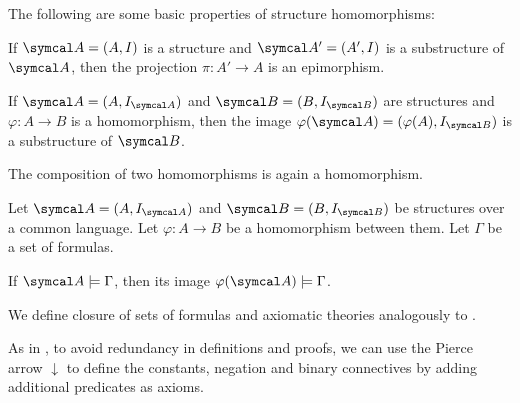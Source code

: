 \begin{proposition}\label{thm:first_order_homomorphism_properties}
  The following are some basic properties of structure homomorphisms:
  \begin{defenum}
     If \( \Cal{A} = (A, I) \) is a structure and \( \Cal{A'} = (A', I) \) is a substructure of \( \Cal{A} \), then the projection \( \pi: A' \to A \) is an epimorphism.

     If \( \Cal{A} = (A, I_{\Cal{A}}) \) and \( \Cal{B} = (B, I_{\Cal{B}}) \) are structures and \( \varphi: A \to B \) is a homomorphism, then the image \( \varphi(\Cal{A}) = (\varphi(A), I_{\Cal{B}}) \) is a substructure of \( \Cal{B} \).

     The composition of two homomorphisms is again a homomorphism.
  \end{defenum}
\end{proposition}

\begin{proposition}\label{thm:first_order_homomorphism_preserves_models}\cite[definition 23.8]{OpenLogic20201202}
  Let \( \Cal{A} = (A, I_{\Cal{A}}) \) and \( \Cal{B} = (B, I_{\Cal{B}}) \) be structures over a common language. Let \( \varphi: A \to B \) be a homomorphism between them. Let \( \Gamma \) be a set of formulas.

  If \( \Cal{A} \models \Gamma \), then its image \( \varphi(\Cal{A}) \models \Gamma \).
\end{proposition}

\begin{definition}\label{def:first_order_theory}
  We define closure of sets of formulas and axiomatic theories analogously to .
\end{definition}

\begin{remark}\label{remark:minimal_first_order_language}
  As in , to avoid redundancy in definitions and proofs, we can use the Pierce arrow \( \downarrow \) to define the constants, negation and binary connectives by adding additional predicates as axioms.
\end{remark}

